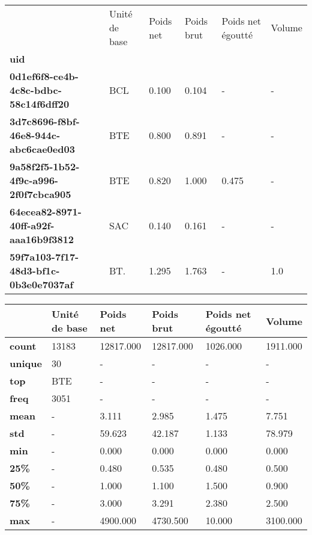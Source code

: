 \begin{tabularx}{\linewidth}{lXXXXX}
\toprule
{} & Unité de base &  Poids net &  Poids brut &  Poids net égoutté &  Volume \\
\textbf{uid                                 } &               &            &             &                    &         \\
\midrule
\textbf{0d1ef6f8-ce4b-4c8c-bdbc-58c14f6dff20} &           BCL &      0.100 &       0.104 &                  - &       - \\
\textbf{3d7c8696-f8bf-46e8-944c-abc6cae0ed03} &           BTE &      0.800 &       0.891 &                  - &       - \\
\textbf{9a58f2f5-1b52-4f9c-a996-2f0f7cbca905} &           BTE &      0.820 &       1.000 &              0.475 &       - \\
\textbf{64ecea82-8971-40ff-a92f-aaa16b9f3812} &           SAC &      0.140 &       0.161 &                  - &       - \\
\textbf{59f7a103-7f17-48d3-bf1c-0b3e0e7037af} &           BT. &      1.295 &       1.763 &                  - &     1.0 \\
\bottomrule
\end{tabularx}
\begin{tabularx}{\linewidth}{lXXXXX}
\toprule
{} & Unité de base &  Poids net &  Poids brut &  Poids net égoutté &    Volume \\
\midrule
\textbf{count } &         13183 &  12817.000 &   12817.000 &           1026.000 &  1911.000 \\
\textbf{unique} &            30 &          - &           - &                  - &         - \\
\textbf{top   } &           BTE &          - &           - &                  - &         - \\
\textbf{freq  } &          3051 &          - &           - &                  - &         - \\
\textbf{mean  } &             - &      3.111 &       2.985 &              1.475 &     7.751 \\
\textbf{std   } &             - &     59.623 &      42.187 &              1.133 &    78.979 \\
\textbf{min   } &             - &      0.000 &       0.000 &              0.000 &     0.000 \\
\textbf{25\%   } &             - &      0.480 &       0.535 &              0.480 &     0.500 \\
\textbf{50\%   } &             - &      1.000 &       1.100 &              1.500 &     0.900 \\
\textbf{75\%   } &             - &      3.000 &       3.291 &              2.380 &     2.500 \\
\textbf{max   } &             - &   4900.000 &    4730.500 &             10.000 &  3100.000 \\
\bottomrule
\end{tabularx}
